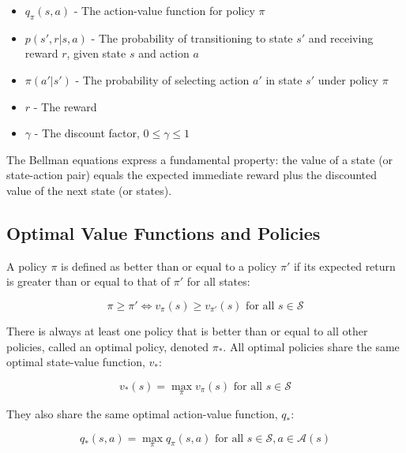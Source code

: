 \documentclass[12pt,a4paper]{article}
\begin{document}
\begin{tcolorbox}[title=Notation Overview]
\begin{itemize}
    \item $q_{\pi}(s,a)$ - The action-value function for policy $\pi$
    \item $p(s',r|s,a)$ - The probability of transitioning to state $s'$ and receiving reward $r$, given state $s$ and action $a$
    \item $\pi(a'|s')$ - The probability of selecting action $a'$ in state $s'$ under policy $\pi$
    \item $r$ - The reward
    \item $\gamma$ - The discount factor, $0 \leq \gamma \leq 1$
\end{itemize}
\end{tcolorbox}

The Bellman equations express a fundamental property: the value of a state (or state-action pair) equals the expected immediate reward plus the discounted value of the next state (or states).

\subsection{Optimal Value Functions and Policies}

A policy $\pi$ is defined as better than or equal to a policy $\pi'$ if its expected return is greater than or equal to that of $\pi'$ for all states:

\begin{equation}
\pi \geq \pi' \iff v_{\pi}(s) \geq v_{\pi'}(s) \text{ for all } s \in \mathcal{S}
\end{equation}

There is always at least one policy that is better than or equal to all other policies, called an optimal policy, denoted $\pi_*$. All optimal policies share the same optimal state-value function, $v_*$:

\begin{equation}
v_*(s) = \max_{\pi} v_{\pi}(s) \text{ for all } s \in \mathcal{S}
\end{equation}

They also share the same optimal action-value function, $q_*$:

\begin{equation}
q_*(s,a) = \max_{\pi} q_{\pi}(s,a) \text{ for all } s \in \mathcal{S}, a \in \mathcal{A}(s)
\end{equation}
\end{document}
